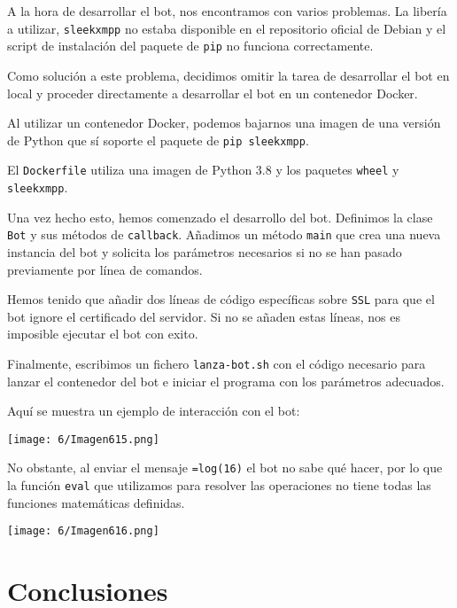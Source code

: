A la hora de desarrollar el bot, nos encontramos con varios problemas.
La libería a utilizar, \Verb#sleekxmpp# no estaba disponible en el repositorio
oficial de Debian y el script de instalación del paquete de \Verb#pip# no funciona correctamente.

Como solución a este problema, decidimos omitir la tarea de desarrollar el bot en local
y proceder directamente a desarrollar el bot en un contenedor Docker.

Al utilizar un contenedor Docker, podemos bajarnos una imagen de una versión de Python que sí soporte
el paquete de \Verb#pip sleekxmpp#.

El \Verb#Dockerfile# utiliza una imagen de Python 3.8
y los paquetes \Verb#wheel# y \Verb#sleekxmpp#.

Una vez hecho esto, hemos comenzado el desarrollo del bot.
Definimos la clase \Verb#Bot# y sus métodos de \Verb#callback#.
Añadimos un método \Verb#main# que crea una nueva instancia del bot
y solicita los parámetros necesarios si no se han pasado previamente
por línea de comandos.

Hemos tenido que añadir dos líneas de código específicas sobre \Verb#SSL#
para que el bot ignore el certificado del servidor.
Si no se añaden estas líneas, nos es imposible ejecutar el bot con exito.

Finalmente, escribimos un fichero \Verb#lanza-bot.sh# con el código necesario
para lanzar el contenedor del bot e iniciar el programa con los parámetros adecuados.

Aquí se muestra un ejemplo de interacción con el bot: \\
\begin{minipage}{\linewidth}
	\centering
	\texttt{[image: 6/Imagen615.png]}
	\label{fig:6/6}
\end{minipage}

No obstante, al enviar el mensaje \verb#=log(16)#
el bot no sabe qué hacer, por lo que la función \verb#eval#
que utilizamos para resolver las operaciones no tiene todas
las funciones matemáticas definidas.

\begin{minipage}{\linewidth}
	\centering
	\texttt{[image: 6/Imagen616.png]}
	\label{fig:6/7}
\end{minipage}

\section{Conclusiones}

